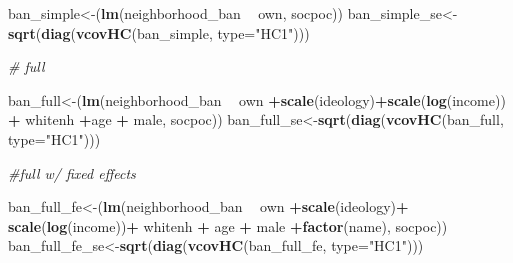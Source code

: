 \documentclass[]{article}
\newenvironment{Shaded}{\begin{snugshade}}{\end{snugshade}}
\newcommand{\CommentTok}[1]{\textcolor[rgb]{0.56,0.35,0.01}{\textit{#1}}}
\newcommand{\DataTypeTok}[1]{\textcolor[rgb]{0.13,0.29,0.53}{#1}}
\newcommand{\KeywordTok}[1]{\textcolor[rgb]{0.13,0.29,0.53}{\textbf{#1}}}
\newcommand{\NormalTok}[1]{#1}
\newcommand{\OperatorTok}[1]{\textcolor[rgb]{0.81,0.36,0.00}{\textbf{#1}}}
\newcommand{\StringTok}[1]{\textcolor[rgb]{0.31,0.60,0.02}{#1}}
\begin{document}
\begin{Shaded}
\begin{Highlighting}[]
{{{\NormalTok{ban_simple<-(}\KeywordTok{lm}\NormalTok{(neighborhood_ban }\OperatorTok{~}\StringTok{ }\NormalTok{own, socpoc))}
\NormalTok{ban_simple_se<-}\KeywordTok{sqrt}\NormalTok{(}\KeywordTok{diag}\NormalTok{(}\KeywordTok{vcovHC}\NormalTok{(ban_simple, }\DataTypeTok{type=}\StringTok{"HC1"}\NormalTok{)))}

\CommentTok{# full}

\NormalTok{ban_full<-(}\KeywordTok{lm}\NormalTok{(neighborhood_ban }\OperatorTok{~}\StringTok{ }\NormalTok{own }\OperatorTok{+}\KeywordTok{scale}\NormalTok{(ideology)}\OperatorTok{+}\KeywordTok{scale}\NormalTok{(}\KeywordTok{log}\NormalTok{(income)) }\OperatorTok{+}\StringTok{ }\NormalTok{whitenh  }\OperatorTok{+}\NormalTok{age }\OperatorTok{+}\StringTok{ }\NormalTok{male, socpoc))}
\NormalTok{ban_full_se<-}\KeywordTok{sqrt}\NormalTok{(}\KeywordTok{diag}\NormalTok{(}\KeywordTok{vcovHC}\NormalTok{(ban_full, }\DataTypeTok{type=}\StringTok{"HC1"}\NormalTok{)))}

\CommentTok{#full w/ fixed effects}

\NormalTok{ban_full_fe<-(}\KeywordTok{lm}\NormalTok{(neighborhood_ban }\OperatorTok{~}\StringTok{  }\NormalTok{own }\OperatorTok{+}\KeywordTok{scale}\NormalTok{(ideology)}\OperatorTok{+}\StringTok{ }\KeywordTok{scale}\NormalTok{(}\KeywordTok{log}\NormalTok{(income))}\OperatorTok{+}\StringTok{ }\NormalTok{whitenh  }\OperatorTok{+}\StringTok{ }\NormalTok{age }\OperatorTok{+}\StringTok{ }\NormalTok{male }\OperatorTok{+}\KeywordTok{factor}\NormalTok{(name), socpoc))}
\NormalTok{ban_full_fe_se<-}\KeywordTok{sqrt}\NormalTok{(}\KeywordTok{diag}\NormalTok{(}\KeywordTok{vcovHC}\NormalTok{(ban_full_fe, }\DataTypeTok{type=}\StringTok{"HC1"}\NormalTok{)))}

}}}
\end{Highlighting}
\end{Shaded}
\end{document}
